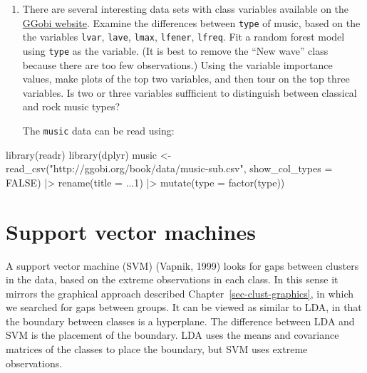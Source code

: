 \documentclass[
  letterpaper,
]{krantz}
\newenvironment{Shaded}{\begin{snugshade}}{\end{snugshade}}
\newcommand{\AttributeTok}[1]{\textcolor[rgb]{0.40,0.45,0.13}{#1}}
\newcommand{\ConstantTok}[1]{\textcolor[rgb]{0.56,0.35,0.01}{#1}}
\newcommand{\FunctionTok}[1]{\textcolor[rgb]{0.28,0.35,0.67}{#1}}
\newcommand{\NormalTok}[1]{\textcolor[rgb]{0.00,0.23,0.31}{#1}}
\newcommand{\OtherTok}[1]{\textcolor[rgb]{0.00,0.23,0.31}{#1}}
\newcommand{\SpecialCharTok}[1]{\textcolor[rgb]{0.37,0.37,0.37}{#1}}
\newcommand{\StringTok}[1]{\textcolor[rgb]{0.13,0.47,0.30}{#1}}
\begin{document}
\begin{enumerate}
\def\labelenumi{\arabic{enumi}.}
\setcounter{enumi}{6}
\item
  There are several interesting data sets with class variables available
  on the \href{http://ggobi.org/book/index.html}{GGobi website}. Examine
  the differences between \texttt{type} of music, based on the the
  variables \texttt{lvar}, \texttt{lave}, \texttt{lmax},
  \texttt{lfener}, \texttt{lfreq}. Fit a random forest model using
  \texttt{type} as the variable. (It is best to remove the ``New wave''
  class because there are too few observations.) Using the variable
  importance values, make plots of the top two variables, and then tour
  on the top three variables. Is two or three variables suffficient to
  distinguish between classical and rock music types?

  The \texttt{music} data can be read using:
\end{enumerate}

\begin{Shaded}
\begin{Highlighting}[]
\FunctionTok{library}\NormalTok{(readr)}
\FunctionTok{library}\NormalTok{(dplyr)}
\NormalTok{music }\OtherTok{\textless{}{-}} \FunctionTok{read\_csv}\NormalTok{(}\StringTok{"http://ggobi.org/book/data/music{-}sub.csv"}\NormalTok{,}
                  \AttributeTok{show\_col\_types =} \ConstantTok{FALSE}\NormalTok{) }\SpecialCharTok{|\textgreater{}}
  \FunctionTok{rename}\NormalTok{(}\AttributeTok{title =} \StringTok{\textasciigrave{}}\AttributeTok{...1}\StringTok{\textasciigrave{}}\NormalTok{) }\SpecialCharTok{|\textgreater{}}
  \FunctionTok{mutate}\NormalTok{(}\AttributeTok{type =} \FunctionTok{factor}\NormalTok{(type))}
\end{Highlighting}
\end{Shaded}

\chapter{Support vector machines}\label{support-vector-machines}


A support vector machine (SVM) (Vapnik, 1999) looks for gaps between
clusters in the data, based on the extreme observations in each class.
In this sense it mirrors the graphical approach described
Chapter~\ref{sec-clust-graphics}, in which we searched for gaps between
groups. It can be viewed as similar to LDA, in that the boundary between
classes is a hyperplane. The difference between LDA and SVM is the
placement of the boundary. LDA uses the means and covariance matrices of
the classes to place the boundary, but SVM uses extreme observations.
\end{document}
